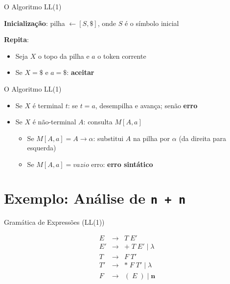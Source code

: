 \begin{frame}{O Algoritmo LL(1)}

    \textbf{Inicialização}: pilha \(\leftarrow [S, \$]\), onde \(S\) é o
    símbolo inicial

    \textbf{Repita}:

    \begin{itemize}

        \item
        Seja \(X\) o topo da pilha e \(a\) o token corrente
        \item
        Se \(X = \$\) e \(a = \$\): \textbf{aceitar}
    \end{itemize}
\end{frame}

\begin{frame}{O Algoritmo LL(1)}

    \begin{itemize}

        \item
        Se \(X\) é terminal \(t\): se \(t = a\), desempilha e avança; senão
        \textbf{erro}
        \item
        Se \(X\) é não-terminal \(A\): consulta \(M[A, a]\)

        \begin{itemize}

            \item
            Se \(M[A, a] = A \to \alpha\): substitui \(A\) na pilha por
            \(\alpha\) (da direita para esquerda)
            \item
            Se \(M[A, a] = vazio\) erro: \textbf{erro sintático}
        \end{itemize}
    \end{itemize}
\end{frame}


\section{\texorpdfstring{Exemplo: Análise de
\texttt{n\ +\ n}}{Exemplo: Análise de n + n}}\label{exemplo-anuxe1lise-de-n-n}

\begin{frame}{Gramática de Expressões (LL(1))}

    \[\begin{array}{lcl}
    E  &\to& T\; E' \\
    E' &\to& +\; T\; E' \mid \lambda \\
    T  &\to& F\; T' \\
    T' &\to& *\; F\; T' \mid \lambda \\
    F  &\to& (\; E\; ) \mid \mathbf{n}
\end{array}\]
\end{frame}

